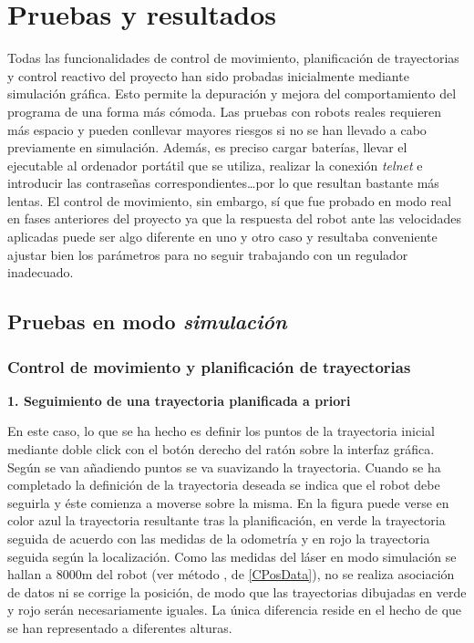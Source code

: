 \section{Pruebas y resultados}
Todas las funcionalidades de control de movimiento, planificación de trayectorias y control reactivo del proyecto han sido probadas inicialmente mediante simulación gráfica. Esto permite la depuración y mejora del comportamiento del programa de una forma más cómoda. Las pruebas con robots reales requieren más espacio y pueden conllevar mayores riesgos si no se han llevado a cabo previamente en simulación. Además, es preciso cargar baterías, llevar el ejecutable al ordenador portátil que se utiliza, realizar la conexión \emph{telnet} e introducir las contraseñas correspondientes\ldots por lo que resultan bastante más lentas. El control de movimiento, sin embargo, sí que fue probado en modo real en fases anteriores del proyecto ya que la respuesta del robot ante las velocidades aplicadas puede ser algo diferente en uno y otro caso y resultaba conveniente ajustar bien los parámetros para no seguir trabajando con un regulador inadecuado.

\subsection{Pruebas en modo \emph{simulación}}

\subsubsection{Control de movimiento y planificación de trayectorias}

\noindent
\textbf{\textbf{1.} Seguimiento de una trayectoria planificada a priori}

En este caso, lo que se ha hecho es definir los puntos de la trayectoria inicial mediante doble click con el botón derecho del ratón sobre la interfaz gráfica. Según se van añadiendo puntos se va suavizando la trayectoria. Cuando se ha completado la definición de la trayectoria deseada se indica que el robot debe seguirla y éste comienza a moverse sobre la misma. En la figura puede verse en color azul la trayectoria resultante tras la planificación, en verde la trayectoria seguida de acuerdo con las medidas de la odometría y en rojo la trayectoria seguida según la localización. Como las medidas del láser en modo simulación se hallan a 8000m del robot (ver método , de \ref{CPosData}), no se realiza asociación de datos ni se corrige la posición, de modo que las trayectorias dibujadas en verde y rojo serán necesariamente iguales. La única diferencia reside en el hecho de que se han representado a diferentes alturas.



